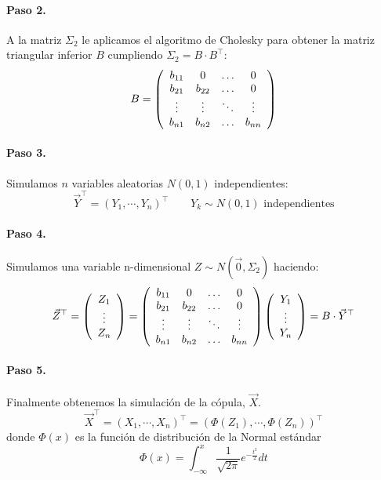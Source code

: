 \paragraph{Paso 2.} A la matriz $\Sigma_2$ le aplicamos el algoritmo de 
Cholesky para obtener la matriz triangular
inferior $B$ cumpliendo $\Sigma_2 = B \cdot B^{\top}$:
\begin{displaymath}
B = 
\left(
\begin{array}{cccc}
b_{11}   & 0        & \ldots & 0       \cr
b_{21}   & b_{22}   & \ldots & 0       \cr
\vdots  & \vdots  & \ddots & \vdots \cr
b_{n1}   & b_{n2}   & \ldots & b_{nn}
\end{array}
\right)
\end{displaymath}

\paragraph{Paso 3.} Simulamos $n$ variables aleatorias $N(0,1)$ independientes:
\begin{displaymath}
\vec{Y}^{\top}=(Y_1, \cdots, Y_n)^{\top} \qquad Y_k \sim N(0,1) \textrm{ independientes}
\end{displaymath}

\paragraph{Paso 4.} Simulamos una variable n-dimensional $Z \sim N(\vec{0}, \Sigma_2)$
haciendo:
\begin{displaymath}
\vec{Z}^{\top} = 
\left(
\begin{array}{c}
Z_1 \cr
\vdots \cr
Z_n
\end{array}
\right) 
=
\left(
\begin{array}{cccc}
b_{11}   & 0        & \ldots & 0       \cr
b_{21}   & b_{22}   & \ldots & 0       \cr
\vdots  & \vdots  & \ddots & \vdots \cr
b_{n1}   & b_{n2}   & \ldots & b_{nn}
\end{array}
\right)
\left(
\begin{array}{c}
Y_1 \cr
\vdots \cr
Y_n
\end{array}
\right) 
 = B \cdot \vec{Y}^{\top}
\end{displaymath}

\paragraph{Paso 5.} Finalmente obtenemos la simulaci\'on de la c\'opula, $\vec{X}$.
\begin{displaymath}
\vec{X}^{\top} = (X_1, \cdots, X_n)^{\top} = (\Phi(Z_1), \cdots, \Phi(Z_n))^{\top}
\end{displaymath}
donde $\Phi(x)$ es la funci\'on de distribuci\'on de la Normal est\'andar
\begin{displaymath}
\Phi(x) = \int_{-\infty}^{x} \frac{1}{\sqrt{2 \pi}} e^{-\frac{t^2}{2}} dt
\end{displaymath}

